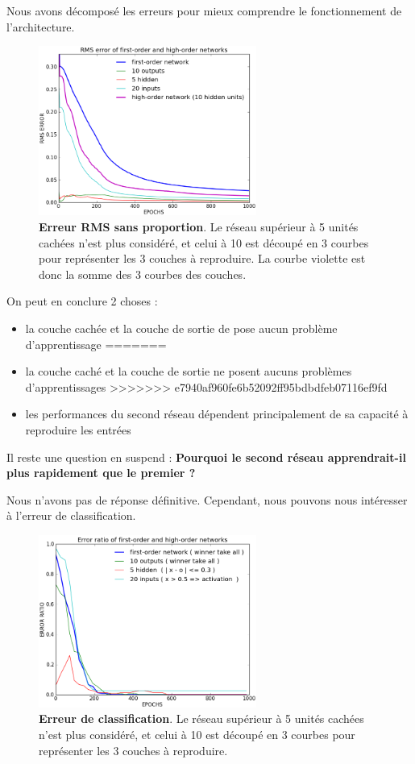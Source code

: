 \documentclass[a4paper,12pt, twoside]{article}
\begin{document}
Nous avons décomposé les erreurs pour mieux comprendre le fonctionnement de l'architecture.

\begin{figure}[H]
\begin{center}
 \includegraphics[width=270px]{../cleeremans_2007/digit_reco/rms_ffa.png}
\end{center}
\caption{ \textbf{Erreur RMS sans proportion}. Le réseau supérieur à 5 unités cachées n'est plus considéré, et celui à 
10 est découpé en 3 courbes pour représenter les 3 couches à reproduire. La courbe violette est donc la somme des 3 courbes des 
couches.}
\end{figure}

On peut en conclure 2 choses :
\begin{itemize}
<<<<<<< HEAD
 \item la couche cachée et la couche de sortie de pose aucun problème d'apprentissage
=======
 \item la couche caché et la couche de sortie ne posent aucuns problèmes d'apprentissages
>>>>>>> e7940af960fe6b52092ff95bdbdfeb07116ef9fd
 \item les performances du second réseau dépendent principalement de sa capacité à reproduire les entrées
\end{itemize}

Il reste une question en suspend :
\newline
\textbf{Pourquoi le second réseau apprendrait-il plus rapidement que le premier ?}

Nous n'avons pas de réponse définitive. Cependant, nous pouvons nous intéresser à l'erreur de classification.

\begin{figure}[H]
\begin{center}
 \includegraphics[width=270px]{../cleeremans_2007/digit_reco/err_ffa.png}
\end{center}
\caption{ \textbf{Erreur de classification}. Le réseau supérieur à 5 unités cachées n'est plus considéré, et celui à
10 est découpé en 3 courbes pour représenter les 3 couches à reproduire.}
\end{figure}
\end{document}
